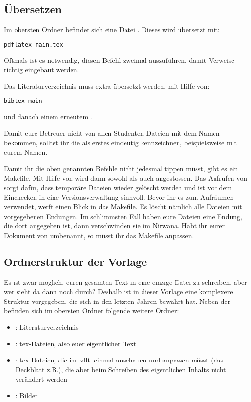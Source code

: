 \subsection{Übersetzen}
%
Im obersten Ordner befindet sich eine Datei .
Dieses wird übersetzt mit:
%
\begin{lstlisting}[language=bash]
pdflatex main.tex
\end{lstlisting}
%
Oftmals ist es notwendig, diesen Befehl zweimal auszuführen, damit
Verweise richtig eingebaut werden.
%
\par
%
Das Literaturverzeichnis muss extra übersetzt werden, mit Hilfe von:
%
\begin{lstlisting}[language=bash]
bibtex main
\end{lstlisting}
%
und danach einem erneutem .
%
\par
%
Damit eure Betreuer nicht von allen Studenten Dateien mit dem Namen
 bekommen, solltet ihr die  als erstes
eindeutig kennzeichnen, beispielsweise mit eurem Namen.
%
\par
%
Damit ihr die oben genannten Befehle nicht jedesmal tippen m\"usst, gibt
es ein Makefile.
Mit Hilfe von  wird dann sowohl  als auch
 angestossen.
Das Aufrufen von  sorgt daf\"ur, dass tempor\"are Dateien
wieder gel\"oscht werden und ist vor dem Einchecken in eine Versionsverwaltung
sinnvoll.
Bevor ihr es zum Aufräumen verwendet, werft einen Blick in das Makefile.
Es l\"oscht n\"amlich alle Dateien mit vorgegebenen Endungen.
Im schlimmsten Fall haben eure Dateien eine Endung, die dort angegeben ist,
dann verschwinden sie im Nirwana.
Habt ihr eurer Dokument von  umbenannt, so m\"usst ihr das
Makefile anpassen.
%
\subsection{Ordnerstruktur der Vorlage}
%
Es ist zwar möglich, euren gesamten Text in eine einzige Datei zu schreiben, 
aber wer sieht da dann noch durch?
Deshalb ist in dieser Vorlage eine komplexere Struktur vorgegeben, die sich
in den letzten Jahren bewährt hat.
Neben der  befinden sich im obersten Ordner folgende weitere
Ordner:
\begin{itemize}
	\item {}: Literaturverzeichnis
	\item {}: tex-Dateien, also euer eigentlicher Text
	\item {}: tex-Dateien, die ihr vllt. einmal anschauen und
        anpassen müsst (das Deckblatt z.B.), die aber beim Schreiben des
        eigentlichen Inhalts nicht verändert werden
	\item {}: Bilder 
\end{itemize}
%
%
